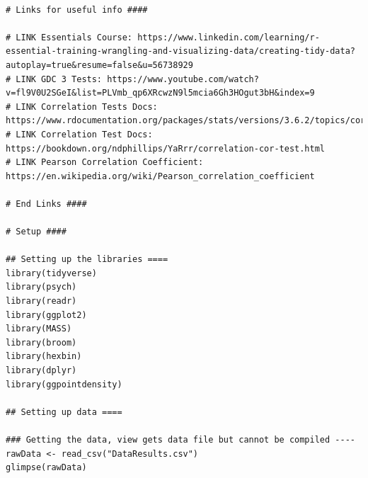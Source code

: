 \documentclass{IEEEtran}
\begin{document}
\begin{verbatim}

# Links for useful info ####

# LINK Essentials Course: https://www.linkedin.com/learning/r-essential-training-wrangling-and-visualizing-data/creating-tidy-data?autoplay=true&resume=false&u=56738929
# LINK GDC 3 Tests: https://www.youtube.com/watch?v=fl9V0U2SGeI&list=PLVmb_qp6XRcwzN9l5mcia6Gh3HOgut3bH&index=9
# LINK Correlation Tests Docs: https://www.rdocumentation.org/packages/stats/versions/3.6.2/topics/cor.test
# LINK Correlation Test Docs: https://bookdown.org/ndphillips/YaRrr/correlation-cor-test.html
# LINK Pearson Correlation Coefficient: https://en.wikipedia.org/wiki/Pearson_correlation_coefficient

# End Links ####

# Setup ####

## Setting up the libraries ====
library(tidyverse)
library(psych)
library(readr)
library(ggplot2)
library(MASS)
library(broom)
library(hexbin)
library(dplyr)
library(ggpointdensity)

## Setting up data ====

### Getting the data, view gets data file but cannot be compiled ----
rawData <- read_csv("DataResults.csv")
glimpse(rawData)


\end{verbatim}
\end{document}
